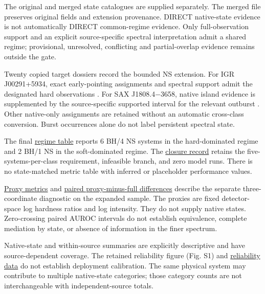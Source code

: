 \documentclass[final,5p,authoryear,nopreprintline]{elsarticle}
\begin{document}
The original and merged state catalogues are supplied separately. The merged file preserves original fields and extension provenance. DIRECT native-state evidence is not automatically DIRECT common-regime evidence. Only full-observation support and an explicit source-specific spectral interpretation admit a shared regime; provisional, unresolved, conflicting and partial-overlap evidence remains outside the gate.

Twenty copied target dossiers record the bounded NS extension. For IGR J00291+5934, exact early-pointing assignments and spectral support admit the designated hard observations \citep{Linares2007,Falanga2005}. For SAX J1808.4$-$3658, native island evidence is supplemented by the source-specific supported interval for the relevant outburst \citep{Bult2015,Ibragimov2009}. Other native-only assignments are retained without an automatic cross-class conversion. Burst occurrences alone do not label persistent spectral state.

The final \href{https://github.com/YouhanCW/bhns-source-generalization/blob/3c5bb50b1820ef89f816fc2f4da0fb6c69f359f7/manuscript/supplement/tables/S5_final_regime_counts.csv}{regime table} reports 6 BH/4 NS systems in the hard-dominated regime and 2 BH/1 NS in the soft-dominated regime. The \href{https://github.com/YouhanCW/bhns-source-generalization/blob/3c5bb50b1820ef89f816fc2f4da0fb6c69f359f7/manuscript/supplement/tables/S5_closure.json}{closure record} retains the five-systems-per-class requirement, infeasible branch, and zero model runs. There is no state-matched metric table with inferred or placeholder performance values.

\href{https://github.com/YouhanCW/bhns-source-generalization/blob/3c5bb50b1820ef89f816fc2f4da0fb6c69f359f7/manuscript/supplement/tables/S5_proxy_metrics.csv}{Proxy metrics} and \href{https://github.com/YouhanCW/bhns-source-generalization/blob/3c5bb50b1820ef89f816fc2f4da0fb6c69f359f7/manuscript/supplement/tables/S5_proxy_full_paired.csv}{paired proxy-minus-full differences} describe the separate three-coordinate diagnostic on the expanded sample. The proxies are fixed detector-space log hardness ratios and log intensity. They do not supply native states. Zero-crossing paired AUROC intervals do not establish equivalence, complete mediation by state, or absence of information in the finer spectrum.

Native-state and within-source summaries are explicitly descriptive and have source-dependent coverage. The retained reliability figure (Fig. S1) and \href{https://github.com/YouhanCW/bhns-source-generalization/blob/3c5bb50b1820ef89f816fc2f4da0fb6c69f359f7/manuscript/supplement/tables/S5_reliability.csv}{reliability data} do not establish deployment calibration. The same physical system may contribute to multiple native-state categories; those category counts are not interchangeable with independent-source totals.
\end{document}
